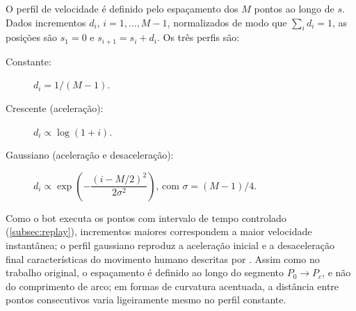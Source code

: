 O perfil de velocidade é definido pelo espaçamento dos $M$ pontos ao longo de $s$. Dados incrementos $d_i$, $i = 1, \ldots, M-1$, normalizados de modo que $\sum_i d_i = 1$, as posições são $s_1 = 0$ e $s_{i+1} = s_i + d_i$. Os três perfis são:
\begin{description}
    \item[Constante:] $d_i = 1/(M-1)$.
    \item[Crescente (aceleração):] $d_i \propto \log(1 + i)$.
    \item[Gaussiano (aceleração e desaceleração):] $d_i \propto \exp\left(-\dfrac{(i - M/2)^2}{2\sigma^2}\right)$, com $\sigma = (M-1)/4$.
\end{description}
Como o bot executa os pontos com intervalo de tempo controlado (\autoref{subsec:replay}), incrementos maiores correspondem a maior velocidade instantânea; o perfil gaussiano reproduz a aceleração inicial e a desaceleração final características do movimento humano descritas por . Assim como no trabalho original, o espaçamento é definido ao longo do segmento $P_0 \to P_c$, e não do comprimento de arco; em formas de curvatura acentuada, a distância entre pontos consecutivos varia ligeiramente mesmo no perfil constante.

